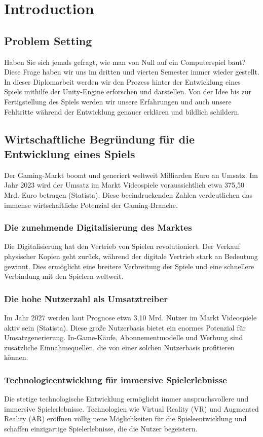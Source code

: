 
\chapter{Introduction}

\section{Problem Setting}
Haben Sie sich jemals gefragt, wie man von Null auf ein Computerspiel baut? Diese Frage haben wir uns im dritten und vierten Semester immer wieder gestellt. In dieser Diplomarbeit werden wir den Prozess hinter der Entwicklung eines Spiels mithilfe der Unity-Engine erforschen und darstellen. Von der Idee bis zur Fertigstellung des Spiels werden wir unsere Erfahrungen und auch unsere Fehltritte während der Entwicklung genauer erklären und bildlich schildern.

\section{Wirtschaftliche Begründung für die Entwicklung eines Spiels}
Der Gaming-Markt boomt und generiert weltweit Milliarden Euro an Umsatz. Im Jahr 2023 wird der Umsatz im Markt Videospiele voraussichtlich etwa 375,50 Mrd. Euro betragen (Statista). Diese beeindruckenden Zahlen verdeutlichen das immense wirtschaftliche Potenzial der Gaming-Branche.

\subsection{Die zunehmende Digitalisierung des Marktes}
Die Digitalisierung hat den Vertrieb von Spielen revolutioniert. Der Verkauf physischer Kopien geht zurück, während der digitale Vertrieb stark an Bedeutung gewinnt. Dies ermöglicht eine breitere Verbreitung der Spiele und eine schnellere Verbindung mit den Spielern weltweit.

\subsection{Die hohe Nutzerzahl als Umsatztreiber}
Im Jahr 2027 werden laut Prognose etwa 3,10 Mrd. Nutzer im Markt Videospiele aktiv sein (Statista). Diese große Nutzerbasis bietet ein enormes Potenzial für Umsatzgenerierung. In-Game-Käufe, Abonnementmodelle und Werbung sind zusätzliche Einnahmequellen, die von einer solchen Nutzerbasis profitieren können.

\subsection{Technologieentwicklung für immersive Spielerlebnisse}
Die stetige technologische Entwicklung ermöglicht immer anspruchsvollere und immersive Spielerlebnisse. Technologien wie Virtual Reality (VR) und Augmented Reality (AR) eröffnen völlig neue Möglichkeiten für die Spieleentwicklung und schaffen einzigartige Spielerlebnisse, die die Nutzer begeistern.

